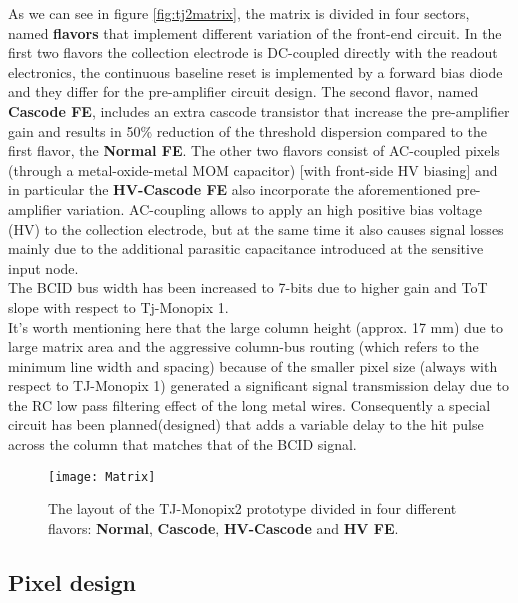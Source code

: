 As we can see in figure \vref{fig:tj2matrix}, the matrix is divided in four sectors, named \textbf{flavors} that implement different variation of the front-end circuit. In the first two flavors the collection electrode is DC-coupled directly with the readout electronics,  the continuous baseline reset is implemented by a forward bias diode and they differ for the pre-amplifier circuit design. The second flavor, named \textbf{Cascode FE}, includes an extra cascode transistor that increase the pre-amplifier gain and results in 50\% reduction of the threshold dispersion compared to the first flavor, the \textbf{Normal FE}. The other two flavors consist of AC-coupled pixels (through a metal-oxide-metal MOM capacitor) [with front-side HV biasing] and in particular the \textbf{HV-Cascode FE} also incorporate the aforementioned pre-amplifier variation. AC-coupling allows to apply an high positive bias voltage (HV) to the collection electrode, but at the same time it also causes signal losses mainly due to the additional parasitic capacitance introduced at the sensitive input node.\\
The BCID bus width has been increased  to 7-bits due to higher gain and ToT slope with respect to Tj-Monopix 1. \\
It's worth mentioning here that the large column height (approx. 17 mm) due to large matrix area and the aggressive column-bus routing (which refers to the minimum line width and spacing) because of the smaller pixel size (always with respect to TJ-Monopix 1) generated a significant signal transmission delay due to the RC low pass filtering effect of the long metal wires. Consequently a special circuit has been planned(designed) that adds a variable delay to the hit pulse across the column that matches that of the BCID signal.




\begin{figure}[h!]
\centering
\texttt{[image: Matrix]}
\caption{The layout of the TJ-Monopix2 prototype divided in four different flavors: \textbf{Normal}, \textbf{Cascode}, \textbf{HV-Cascode} and \textbf{HV FE}.}
\label{fig:tj2matrix}
\end{figure}



\subsection{Pixel design}


